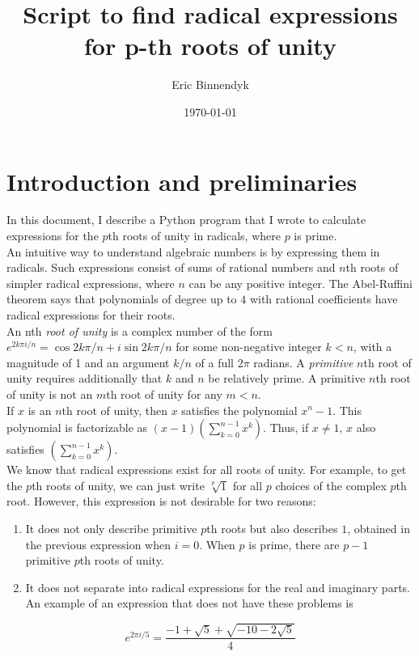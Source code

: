 \documentclass{article}
\title{Script to find radical expressions for p-th roots of unity}
\author{Eric Binnendyk}
\date{\today}
\begin{document}
\maketitle

\section{Introduction and preliminaries}
	In this document, I describe a Python program that I wrote to calculate expressions for the $ p $th roots of unity in radicals, where $ p $ is prime.\\
	An intuitive way to understand algebraic numbers is by expressing them in radicals. Such expressions consist of sums of rational numbers and $ n $th roots of simpler radical expressions, where $ n $ can be any positive integer. The Abel-Ruffini theorem says that polynomials of degree up to $ 4 $ with rational coefficients have radical expressions for their roots.\\
	An nth \textit{root of unity} is a complex number of the form $ e^{2k \pi i/ n} = \cos{2k \pi/n} + i \sin{2k \pi/n} $ for some non-negative integer $ k < n $, with a magnitude of 1 and an argument $ k/n $ of a full $ 2 \pi $ radians. A \textit{primitive} $ n $th root of unity requires additionally that $ k $ and $ n $ be relatively prime. A primitive $ n $th root of unity is not an $ m $th root of unity for any $ m < n $.\\
	If $ x $ is an $ n $th root of unity, then $ x $ satisfies the polynomial $ x^n - 1 $. This polynomial is factorizable as $ (x - 1)(\sum_{k = 0}^{n - 1} x^k) $. Thus, if $ x \ne 1 $, $ x $ also satisfies $ (\sum_{k = 0}^{n - 1} x^k) $.\\
	We know that radical expressions exist for all roots of unity. For example, to get the $ p $th roots of unity, we can just write $ \sqrt[p]{1} $ for all $ p $ choices of the complex $ p $th root. However, this expression is not desirable for two reasons:
	\begin{enumerate}
		\item It does not only describe primitive $ p $th roots but also describes $ 1 $, obtained in the previous expression when $ i = 0 $. When $ p $ is prime, there are $ p - 1 $ primitive $ p $th roots of unity.
		\item It does not separate into radical expressions for the real and imaginary parts. An example of an expression that does not have these problems is
	\end{enumerate}
$$ e^{2 \pi i/5} = \frac{-1 + \sqrt{5} + \sqrt{-10 - 2 \sqrt{5}}}{4} $$
\end{document}
